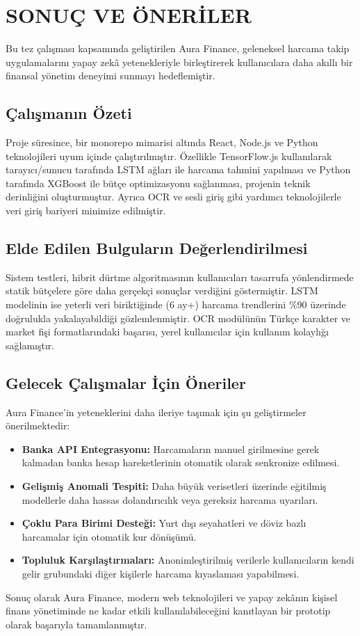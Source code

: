 \chapter{SONUÇ VE ÖNERİLER}\label{ch:sonuc}
\vspace*{-1cm}

Bu tez çalışması kapsamında geliştirilen Aura Finance, geleneksel harcama takip uygulamalarını yapay zekâ yetenekleriyle birleştirerek kullanıcılara daha akıllı bir finansal yönetim deneyimi sunmayı hedeflemiştir.

\section{Çalışmanın Özeti}

Proje süresince, bir monorepo mimarisi altında React, Node.js ve Python teknolojileri uyum içinde çalıştırılmıştır. Özellikle TensorFlow.js kullanılarak tarayıcı/sunucu tarafında LSTM ağları ile harcama tahmini yapılması ve Python tarafında XGBoost ile bütçe optimizasyonu sağlanması, projenin teknik derinliğini oluşturmuştur. Ayrıca OCR ve sesli giriş gibi yardımcı teknolojilerle veri giriş bariyeri minimize edilmiştir.

\section{Elde Edilen Bulguların Değerlendirilmesi}

Sistem testleri, hibrit dürtme algoritmasının kullanıcıları tasarrufa yönlendirmede statik bütçelere göre daha gerçekçi sonuçlar verdiğini göstermiştir. LSTM modelinin ise yeterli veri biriktiğinde (6 ay+) harcama trendlerini \%90 üzerinde doğrulukla yakalayabildiği gözlemlenmiştir. OCR modülünün Türkçe karakter ve market fişi formatlarındaki başarısı, yerel kullanıcılar için kullanım kolaylığı sağlamıştır.

\section{Gelecek Çalışmalar İçin Öneriler}

Aura Finance'in yeteneklerini daha ileriye taşımak için şu geliştirmeler önerilmektedir:
\begin{itemize}
    \item \textbf{Banka API Entegrasyonu:} Harcamaların manuel girilmesine gerek kalmadan banka hesap hareketlerinin otomatik olarak senkronize edilmesi.
    \item \textbf{Gelişmiş Anomali Tespiti:} Daha büyük verisetleri üzerinde eğitilmiş modellerle daha hassas dolandırıcılık veya gereksiz harcama uyarıları.
    \item \textbf{Çoklu Para Birimi Desteği:} Yurt dışı seyahatleri ve döviz bazlı harcamalar için otomatik kur dönüşümü.
    \item \textbf{Topluluk Karşılaştırmaları:} Anonimleştirilmiş verilerle kullanıcıların kendi gelir grubundaki diğer kişilerle harcama kıyaslaması yapabilmesi.
\end{itemize}

Sonuç olarak Aura Finance, modern web teknolojileri ve yapay zekânın kişisel finans yönetiminde ne kadar etkili kullanılabileceğini kanıtlayan bir prototip olarak başarıyla tamamlanmıştır.
